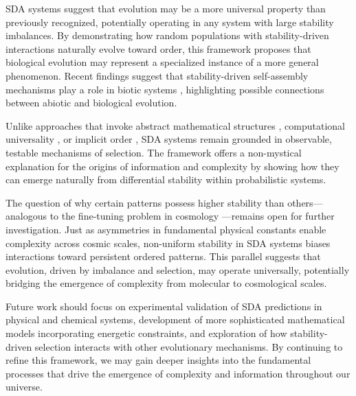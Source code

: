 \documentclass[preprint,12pt]{elsarticle}
\begin{document}
SDA systems suggest that evolution may be a more universal property than previously recognized, potentially operating in any system with large stability imbalances. By demonstrating how random populations with stability-driven interactions naturally evolve toward order, this framework proposes that biological evolution may represent a specialized instance of a more general phenomenon. Recent findings suggest that stability-driven self-assembly mechanisms play a role in biotic systems \cite{davies2022selfassembly}, highlighting possible connections between abiotic and biological evolution.

Unlike approaches that invoke abstract mathematical structures \cite{tegmark2008mathematical}, computational universality \cite{wolfram2020fundamental}, or implicit order \cite{bohm1980wholeness}, SDA systems remain grounded in observable, testable mechanisms of selection. The framework offers a non-mystical explanation for the origins of information and complexity by showing how they can emerge naturally from differential stability within probabilistic systems.

The question of why certain patterns possess higher stability than others—analogous to the fine-tuning problem in cosmology \cite{rees2000just, davies2006goldilocks}—remains open for further investigation. Just as asymmetries in fundamental physical constants enable complexity across cosmic scales, non-uniform stability in SDA systems biases interactions toward persistent ordered patterns. This parallel suggests that evolution, driven by imbalance and selection, may operate universally, potentially bridging the emergence of complexity from molecular to cosmological scales.

Future work should focus on experimental validation of SDA predictions in physical and chemical systems, development of more sophisticated mathematical models incorporating energetic constraints, and exploration of how stability-driven selection interacts with other evolutionary mechanisms. By continuing to refine this framework, we may gain deeper insights into the fundamental processes that drive the emergence of complexity and information throughout our universe.

\end{document}
